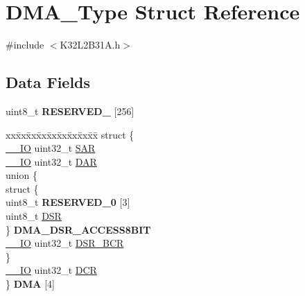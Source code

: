 \hypertarget{struct_d_m_a___type}{}\section{D\+M\+A\+\_\+\+Type Struct Reference}
\label{struct_d_m_a___type}


{\ttfamily \#include $<$K32\+L2\+B31\+A.\+h$>$}

\subsection*{Data Fields}
\begin{DoxyCompactItemize}
\item 
\mbox{\label{struct_d_m_a___type_aa8b44414dcc95e749d18ce191f6a5c44}} 
uint8\+\_\+t {\bfseries R\+E\+S\+E\+R\+V\+E\+D\+\_} \mbox{[}256\mbox{]}
\item 
\mbox{\label{struct_d_m_a___type_a79837a15024418d6ad13621870855ca0}} 
\begin{tabbing}
xx\=xx\=xx\=xx\=xx\=xx\=xx\=xx\=xx\=\kill
struct \{\\
\>\mbox{\hyperlink{core__cm0plus_8h_aec43007d9998a0a0e01faede4133d6be}{\_\_IO}} uint32\_t \mbox{\hyperlink{struct_d_m_a___type_a03a428b9768794844191fe61a3e27f87}{SAR}}\\
\>\mbox{\hyperlink{core__cm0plus_8h_aec43007d9998a0a0e01faede4133d6be}{\_\_IO}} uint32\_t \mbox{\hyperlink{struct_d_m_a___type_a5c5e4c91ad6bcfad9dae85c6c206234d}{DAR}}\\
\mbox{\label{struct_d_m_a___type_1_1_0D21_a4377814f24a87fa1e639d2081dae3d57}} 
\>union \{\\
\>\>struct \{\\
\>\>\>uint8\_t {\bfseries RESERVED\_0} \mbox{[}3\mbox{]}\\
\>\>\>uint8\_t \mbox{\hyperlink{struct_d_m_a___type_af59ac6c373e8107836aab76df475a6cd}{DSR}}\\
\>\>\} {\bfseries DMA\_DSR\_ACCESS8BIT}\\
\>\>\mbox{\hyperlink{core__cm0plus_8h_aec43007d9998a0a0e01faede4133d6be}{\_\_IO}} uint32\_t \mbox{\hyperlink{struct_d_m_a___type_a0e53b71919e79a3b3d41b79397733f49}{DSR\_BCR}}\\
\>\} \\
\>\mbox{\hyperlink{core__cm0plus_8h_aec43007d9998a0a0e01faede4133d6be}{\_\_IO}} uint32\_t \mbox{\hyperlink{struct_d_m_a___type_af6225cb8f4938f98204d11afaffd41c9}{DCR}}\\
\} {\bfseries DMA} \mbox{[}4\mbox{]}\\

\end{tabbing}\end{DoxyCompactItemize}



